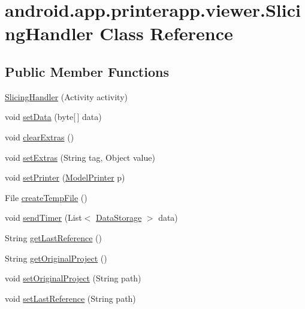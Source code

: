 \hypertarget{classandroid_1_1app_1_1printerapp_1_1viewer_1_1_slicing_handler}{}\section{android.\+app.\+printerapp.\+viewer.\+Slicing\+Handler Class Reference}
\label{classandroid_1_1app_1_1printerapp_1_1viewer_1_1_slicing_handler}
\subsection*{Public Member Functions}
\begin{DoxyCompactItemize}
\item 
\hyperlink{classandroid_1_1app_1_1printerapp_1_1viewer_1_1_slicing_handler_ab6c138a3cb19b580a962cd1798a0fcbb}{Slicing\+Handler} (Activity activity)
\item 
void \hyperlink{classandroid_1_1app_1_1printerapp_1_1viewer_1_1_slicing_handler_adfb12f4306ddca663822419cef377f51}{set\+Data} (byte\mbox{[}$\,$\mbox{]} data)
\item 
void \hyperlink{classandroid_1_1app_1_1printerapp_1_1viewer_1_1_slicing_handler_a9e612badf1979156398590bf5bb2b965}{clear\+Extras} ()
\item 
void \hyperlink{classandroid_1_1app_1_1printerapp_1_1viewer_1_1_slicing_handler_a51ef6ca6c9f259cc2e9c018a9bdc2bde}{set\+Extras} (String tag, Object value)
\item 
void \hyperlink{classandroid_1_1app_1_1printerapp_1_1viewer_1_1_slicing_handler_a7014ca2f8ff7a7e9c7c4e043db10587e}{set\+Printer} (\hyperlink{classandroid_1_1app_1_1printerapp_1_1model_1_1_model_printer}{Model\+Printer} p)
\item 
File \hyperlink{classandroid_1_1app_1_1printerapp_1_1viewer_1_1_slicing_handler_ae169f676f484fe3682646ed4d099cecc}{create\+Temp\+File} ()
\item 
void \hyperlink{classandroid_1_1app_1_1printerapp_1_1viewer_1_1_slicing_handler_acd0c9089ece5d22ca1d95ed3fbcf2a48}{send\+Timer} (List$<$ \hyperlink{classandroid_1_1app_1_1printerapp_1_1viewer_1_1_data_storage}{Data\+Storage} $>$ data)
\item 
String \hyperlink{classandroid_1_1app_1_1printerapp_1_1viewer_1_1_slicing_handler_a2138f9ef3d4eb7b539dfb84caa5a7160}{get\+Last\+Reference} ()
\item 
String \hyperlink{classandroid_1_1app_1_1printerapp_1_1viewer_1_1_slicing_handler_aaea1374ca9d182fc508d0f0fc80773c7}{get\+Original\+Project} ()
\item 
void \hyperlink{classandroid_1_1app_1_1printerapp_1_1viewer_1_1_slicing_handler_ad6e5669a8337b4ea08a0024d78fa4ffc}{set\+Original\+Project} (String path)
\item 
void \hyperlink{classandroid_1_1app_1_1printerapp_1_1viewer_1_1_slicing_handler_a1e01c9925763a77e97aaa7f71cfe5998}{set\+Last\+Reference} (String path)
\end{DoxyCompactItemize}


